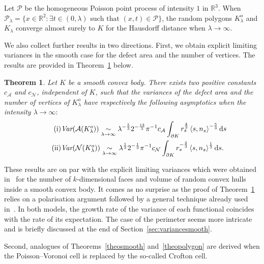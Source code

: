 \documentclass[10pt]{amsart}
\newtheorem{theo}{Theorem}[section]
\theoremstyle{definition}\newtheorem{defi}[theo]{Definition}\newtheorem{rema}[theo]{Remark}\newtheorem{exam}[theo]{Example}\newtheorem{exem}[theo]{Example}\newtheorem{nota}[theo]{Notation}
\newcommand{\cA}{\mathcal{A}}
\newcommand{\cN}{\mathcal{N}}
\newcommand{\cP}{\mathcal{P}}
\newcommand{\dd}{\mathrm{d}}
\newcommand{\R}{\mathbb{R}}
\newcommand{\pass}{\vspace{0.3cm}\noindent}
\let\oldexists\exists
\renewcommand*{\exists}{\mathrel{\oldexists}}
\begin{document}
\begin{coro}\label{cor:bonustrack}
Let ${\cP}$ be the homogeneous Poisson point process of intensity $1$ in $\R^3$. When ${\cP}_\lambda=\{x\in\R^2:\exists t\in (0,\lambda) \text{ such that } (x,t)\in \cP\}$, the random polygons $K_\lambda^o$ and $K_\lambda$ converge almost surely to $K$ for the Hausdorff distance when $\lambda\to\infty$.
\end{coro}

We also collect further results in two directions. First, we obtain explicit limiting variances in the smooth case for the defect area and the number of vertices. The results are provided in Theorem~\ref{theo:var} below.

\begin{theo}\label{theo:var}
Let $K$ be a smooth convex body. There exists two positive constants $c_{\cA}$ and $c_{\cN}$, independent of $K$, such that the variances of the defect area and the number of vertices of $K_{\lambda}^o$ have respectively the following asymptotics when the intensity $\lambda\to\infty:$
\begin{align}
\tag{$\rm i$}\label{theo1.5.i} &\emph{Var}(\cA(K_{\lambda}^o))\underset{\lambda\to\infty}{\sim}\lambda^{-\frac{5}{3}}2^{-\frac{13}{3}}\pi^{-1}c_{\cA}\int_{\partial K} r_s^{\frac4{3}}\left\langle s,n_s\right\rangle^{-\frac{5}{3}}\dd s\\
\tag{$\rm ii$}\label{theo1.5.ii} &\emph{Var}(\cN(K_{\lambda}^o))\underset{\lambda\to\infty}{\sim}\lambda^{\frac{1}{3}}2^{-\frac{1}{3}}\pi^{-1}c_{\cN}\int_{\partial K} r_s^{-\frac{2}{3}}\left\langle s,n_s\right\rangle^{\frac1{3}}\dd s.
\end{align}
\end{theo}

These results are on par with the explicit limiting variances which were obtained in~\cite{cy14} for the number of $k$-dimensional faces and volume of random convex hulls inside a smooth convex body. It comes as no surprise as the proof of Theorem~\ref{theo:var} relies on a polarisation argument followed by a general technique already used in~\cite{cy14}. In both models, the growth rate of the variance of each functional coincides with the rate of its expectation. The case of the perimeter seems more intricate and is briefly discussed at the end of Section~\ref{sec:variancesmooth}.

Second, analogues of Theorems~\ref{theosmooth} and~\ref{theopolygon} are derived when the Poisson--Voronoi cell is replaced by the so-called Crofton cell.
\end{document}
